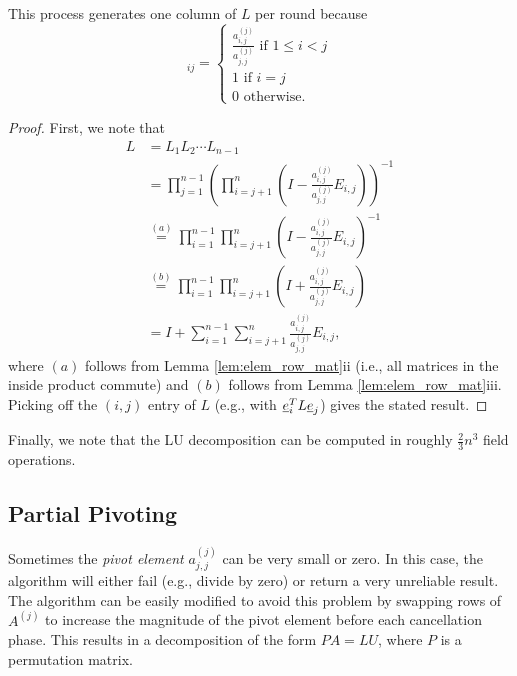 \begin{theorem}
This process generates one column of $L$ per round because
\begin{equation*}
[ L ]_{ij} =
\begin{cases}
\frac{a^{(j)}_{i,j}}{a^{(j)}_{j,j}} \textrm{  if  } 1 \leq i < j \\
1 \textrm{  if  } i=j \\
0 \textrm{  otherwise}.
\end{cases}
\end{equation*}
\end{theorem}
\begin{proof}
First, we note that
\begin{align*}
L & =  L_1 L_2 \cdots L_{n-1} \\
& = \prod_{j=1}^{n-1} \left(  \prod_{i=j+1}^n \left( I - \frac{a^{(j)}_{i,j}}{a^{(j)}_{j,j}} E_{i,j} \right) \right)^{-1} \\
& \stackrel{(a)}{=} \prod_{i=1}^{n-1} \prod_{i=j+1}^n \left( I - \frac{a^{(j)}_{i,j}}{a^{(j)}_{j,j}} E_{i,j} \right)^{-1} \\
& \stackrel{(b)}{=} \prod_{i=1}^{n-1} \prod_{i=j+1}^n \left( I + \frac{a^{(j)}_{i,j}}{a^{(j)}_{j,j}} E_{i,j} \right) \\
& = I + \sum_{i=1}^{n-1} \sum_{i=j+1}^n \frac{a^{(j)}_{i,j}}{a^{(j)}_{j,j}} E_{i,j},
\end{align*}
where $(a)$ follows from Lemma \ref{lem:elem_row_mat}ii (i.e., all matrices in the inside product commute) and $(b)$ follows from Lemma \ref{lem:elem_row_mat}iii.
Picking off the $(i,j)$ entry of $L$ (e.g., with $\underline{e}_i^T L \underline{e}_j$) gives the stated result.
\end{proof}
Finally, we note that the LU decomposition can be computed in roughly $\frac{2}{3}n^3$ field operations.

\subsection{Partial Pivoting}

Sometimes the \emph{pivot element} $a^{(j)}_{j,j}$ can be very small or zero.
In this case, the algorithm will either fail (e.g., divide by zero) or return a very unreliable result.
The algorithm can be easily modified to avoid this problem by swapping rows of $A^{(j)}$ to increase the magnitude of the pivot element before each cancellation phase.
This results in a decomposition of the form $P A = L U$, where $P$ is a permutation matrix.

